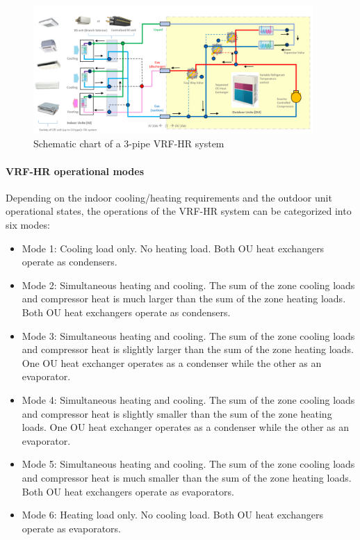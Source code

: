 \begin{figure}[hbtp] %
\centering
\includegraphics[width=0.95\textwidth, height=0.95\textheight, keepaspectratio=true]{media/VRF-HR-Chart-Schematic.png}
\caption{Schematic chart of a 3-pipe VRF-HR system \label{fig:VRF-HR-Chart-Schematic}}
\end{figure}


\paragraph{VRF-HR operational modes}\label{VRF-HR-operational-modes}

Depending on the indoor cooling/heating requirements and the outdoor unit operational states, the operations of the VRF-HR system can be categorized into six modes:

\begin{itemize}
  \item
  Mode 1: Cooling load only. No heating load. Both OU heat exchangers operate as condensers.
  \item
  Mode 2: Simultaneous heating and cooling. The sum of the zone cooling loads and compressor heat is much larger than the sum of the zone heating loads. Both OU heat exchangers operate as condensers.
  \item
  Mode 3: Simultaneous heating and cooling. The sum of the zone cooling loads and compressor heat is slightly larger than the sum of the zone heating loads. One OU heat exchanger operates as a condenser while the other as an evaporator.
  \item
  Mode 4: Simultaneous heating and cooling. The sum of the zone cooling loads and compressor heat is slightly smaller than the sum of the zone heating loads. One OU heat exchanger operates as a condenser while the other as an evaporator.
  \item
  Mode 5: Simultaneous heating and cooling. The sum of the zone cooling loads and compressor heat is much smaller than the sum of the zone heating loads. Both OU heat exchangers operate as evaporators.
  \item
  Mode 6: Heating load only. No cooling load. Both OU heat exchangers operate as evaporators.
\end{itemize}

